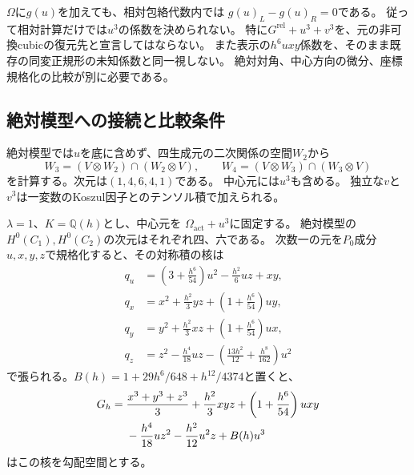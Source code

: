 \begin{remark}[中心の三次式は相対対角からは見えない]
$\Omega$に$g(u)$を加えても、相対包絡代数内では
$g(u)_L-g(u)_R=0$である。
従って相対計算だけでは$u^3$の係数を決められない。
特に$G^{\mathrm{rel}}+u^3+v^3$を、元の非可換cubicの復元先と宣言してはならない。
また表示の$h^6uxy$係数を、そのまま既存の同変正規形の未知係数と同一視しない。
絶対対角、中心方向の微分、座標規格化の比較が別に必要である。
\end{remark}

\subsection{絶対模型への接続と比較条件}
絶対模型では$u$を底に含めず、四生成元の二次関係の空間$W_2$から
\[
 W_3=(V\otimes W_2)\cap(W_2\otimes V),\qquad
 W_4=(V\otimes W_3)\cap(W_3\otimes V)
\]
を計算する。次元は$(1,4,6,4,1)$である。
中心元には$u^3$も含める。
独立な$v$と$v^3$は一変数のKoszul因子とのテンソル積で加えられる。
\begin{proposition}[絶対対角から得られる全次数の三次式]
\label{cd:prop:absolute-formula}
$\lambda=1$、$K=\mathbb Q(h)$とし、中心元を
$\Omega_{\mathrm{act}}+u^3$に固定する。
絶対模型の$H^0(C_1),H^0(C_2)$の次元はそれぞれ四、六である。
次数一の元を$P_0$成分$u,x,y,z$で規格化すると、その対称積の核は
\begin{align*}
 q_u&=\left(3+\frac{h^6}{54}\right)u^2-\frac{h^2}{6}uz+xy,\\
 q_x&=x^2+\frac{h^2}{3}yz+\left(1+\frac{h^6}{54}\right)uy,\\
 q_y&=y^2+\frac{h^2}{3}xz+\left(1+\frac{h^6}{54}\right)ux,\\
 q_z&=z^2-\frac{h^4}{18}uz-
              \left(\frac{13h^2}{12}+\frac{h^8}{162}\right)u^2
\end{align*}
で張られる。$B(h)=1+29h^6/648+h^{12}/4374$と置くと、
\begin{align}
G_h={}&\frac{x^3+y^3+z^3}{3}+\frac{h^2}{3}xyz
 +\left(1+\frac{h^6}{54}\right)uxy\notag\\
 &-\frac{h^4}{18}uz^2-\frac{h^2}{12}u^2z+B(h)u^3
 \label{cd:eq:absolute-polynomial}
\end{align}
はこの核を勾配空間とする。
\end{proposition}
